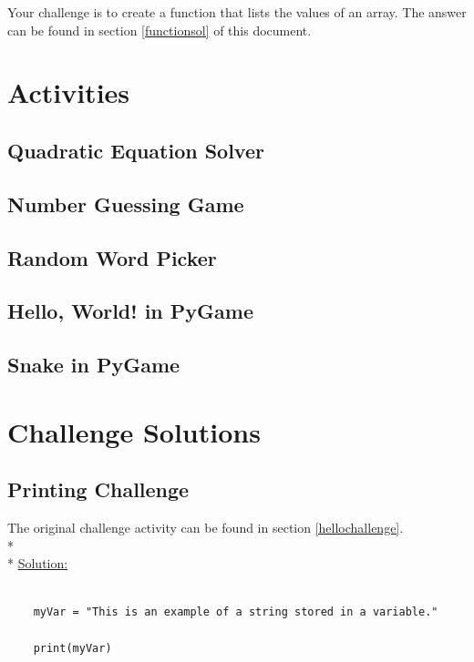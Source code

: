 \documentclass[12pt, letterpaper]{article}
\begin{document}
    Your challenge is to create a function that lists the values of an array. The answer can be found in section \ref{functionsol} of this document.


    \section{Activities} \label{activities}

    \subsection{Quadratic Equation Solver} \label{quadsolver}

    \subsection{Number Guessing Game} \label{numbergame}

    \subsection{Random Word Picker} \label{randomword}

    \subsection{Hello, World! in PyGame} \label{hellopygame}

    \subsection{Snake in PyGame} \label{snake}
    
    \section{Challenge Solutions} \label{solutions}

    \subsection{Printing Challenge} \label{hellosol}
    The original challenge activity can be found in section \ref{hellochallenge}. \\*\\*
    \underline{Solution:}

    \begin{verbatim}
    
    myVar = "This is an example of a string stored in a variable."

    print(myVar)

    \end{verbatim}
\end{document}
